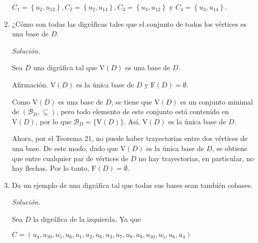\documentclass[12pt, fleqn]{article}
\newcommand{\V}[1]{\mathrm{V} \! \left( #1 \right)}
\newcommand{\F}[1]{\mathrm{F} \! \left( #1 \right)}
\begin{document}
\begin{enumerate}
		$ C_1 = \left\lbrace u_2, u_{12} \right\rbrace, C_2 = \left\lbrace u_2, u_{14} \right\rbrace, C_3 = \left\lbrace u_3, u_{12} \right\rbrace $ y $ C_4 = \left\lbrace u_3, u_{14} \right\rbrace $.

		\item ¿Cómo son todas las digráficas tales que el conjunto de todos los vértices es una base de $D$.
		
		\emph{Solución.}

		Sea $D$ una digráfica tal que $ \V{D} $ es una base de $D$.

		Afirmación. $ \V{D} $ es la única base de $D$ y $ \F{D} = \emptyset $.

		Como $ \V{D} $ es una base de $D$, se tiene que $ \V{D} $ es un conjunto minimal de $ \left( \mathcal{B}_D, \subseteq \right) $, pero todo elemento de este conjunto está contenido en $ \V{D} $, por lo que $ \mathcal{B}_D = \lbrace \V{D} \rbrace $. Así, $ \V{D} $ es la única base de $D$.

		Ahora, por el Teorema 21, no puede haber trayectorias entre dos vértices de una base. De este modo, dado que $ \V{D} $ es la única base de $D$, se obtiene que entre cualquier par de vértices de $D$ no hay trayectorias, en particular, no hay flechas. Por lo tanto, $ \F{D} = \emptyset $.
		
		\item Da un ejemplo de una digráfica tal que todas sus bases sean también cobases.
		
		\begin{minipage}[h]{0.62\linewidth}
			\setlength{\parskip}{3mm}
			\emph{Solución.}

			Sea $D$ la digráfica de la izquierda. Ya que

			$ C = \left( u_4, u_{10}, u_5, u_6, u_1, u_2, u_6, u_3, u_7, u_8, u_9, u_{10}, u_5, u_6, u_4 \right) $ 
			

\end{minipage}
\end{enumerate}
\end{document}
